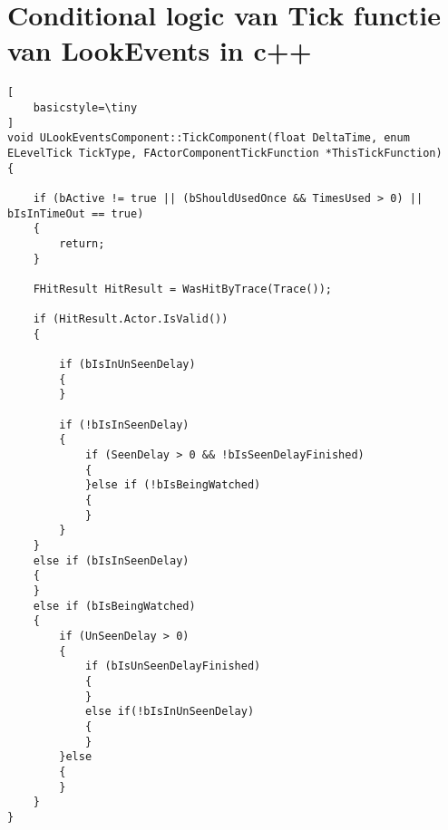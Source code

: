 \chapter{Conditional logic van Tick functie van LookEvents in c++}
\lhead{}
\label{appendix:LookEventsLogicC}

\begin{lstlisting}[
	basicstyle=\tiny
]
void ULookEventsComponent::TickComponent(float DeltaTime, enum ELevelTick TickType, FActorComponentTickFunction *ThisTickFunction) 
{

	if (bActive != true || (bShouldUsedOnce && TimesUsed > 0) || bIsInTimeOut == true) 
	{
		return;
	}

	FHitResult HitResult = WasHitByTrace(Trace());

	if (HitResult.Actor.IsValid())
	{

		if (bIsInUnSeenDelay) 
		{
		}

		if (!bIsInSeenDelay) 
		{
			if (SeenDelay > 0 && !bIsSeenDelayFinished) 
			{
			}else if (!bIsBeingWatched) 
			{		
			}
		}
	}
	else if (bIsInSeenDelay)
	{
	}
	else if (bIsBeingWatched) 
	{
		if (UnSeenDelay > 0) 
		{
			if (bIsUnSeenDelayFinished) 
			{				
			}
			else if(!bIsInUnSeenDelay)
			{					
			}
		}else
		{
		}
	}
}
\end{lstlisting}